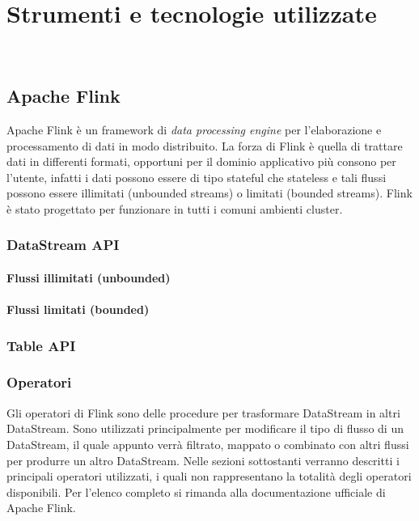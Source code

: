 
\chapter{Strumenti e tecnologie utilizzate}
\label{cap:strumenti-tecnologie}


\\

\section{Apache Flink}
Apache Flink è un \gls{framework} di \textit{data processing engine} per l'elaborazione e processamento di dati in modo distribuito.
La forza di Flink è quella di trattare dati in differenti formati, opportuni per il dominio applicativo più consono per l'utente, infatti i dati possono essere di tipo \gls{stateful} che \gls{stateless} e tali flussi possono essere illimitati (\gls{unbounded streams}) o limitati (\gls{bounded streams}). Flink è stato progettato per funzionare in tutti i comuni ambienti \gls{cluster}.

\subsection{DataStream API}
\subsubsection{Flussi illimitati (unbounded)}
\subsubsection{Flussi limitati (bounded)}

\subsection{Table API}

\subsection{Operatori}
Gli operatori di Flink sono delle procedure per trasformare DataStream in altri DataStream. Sono utilizzati principalmente per modificare il tipo di flusso di un DataStream, il quale appunto verrà filtrato, mappato o combinato con altri flussi per produrre un altro DataStream. Nelle sezioni sottostanti verranno descritti i principali operatori utilizzati, i quali non rappresentano la totalità degli operatori disponibili. Per l'elenco completo si rimanda alla documentazione ufficiale di Apache Flink.

